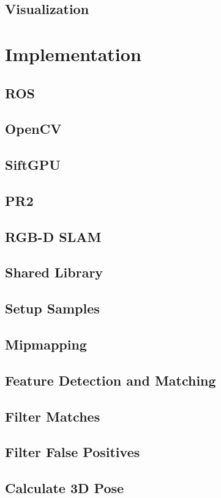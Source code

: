 \documentclass[11pt, twoside, a4paper]{report}
\begin{document}
\subsection{Visualization}

\newpage
\section{Implementation}
\subsection{ROS}
\subsection{OpenCV}
\subsection{SiftGPU}
\subsection{PR2}
\subsection{RGB-D SLAM}
\subsection{Shared Library}
\subsection{Setup Samples}
\subsection{Mipmapping}
\subsection{Feature Detection and Matching}
\subsection{Filter Matches}
\subsection{Filter False Positives}
\subsection{Calculate 3D Pose}
\end{document}

